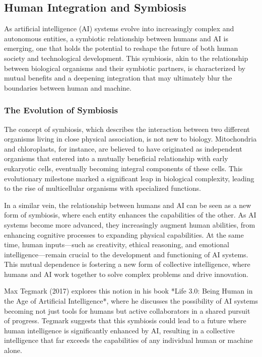 \documentclass[12pt,twoside]{article}
\begin{document}
\subsection{Human Integration and Symbiosis}
As artificial intelligence (AI) systems evolve into increasingly complex and autonomous entities, a symbiotic relationship between humans and AI is emerging, one that holds the potential to reshape the future of both human society and technological development. This symbiosis, akin to the relationship between biological organisms and their symbiotic partners, is characterized by mutual benefits and a deepening integration that may ultimately blur the boundaries between human and machine.

\subsubsection{The Evolution of Symbiosis}

The concept of symbiosis, which describes the interaction between two different organisms living in close physical association, is not new to biology. Mitochondria and chloroplasts, for instance, are believed to have originated as independent organisms that entered into a mutually beneficial relationship with early eukaryotic cells, eventually becoming integral components of these cells. This evolutionary milestone marked a significant leap in biological complexity, leading to the rise of multicellular organisms with specialized functions.

In a similar vein, the relationship between humans and AI can be seen as a new form of symbiosis, where each entity enhances the capabilities of the other. As AI systems become more advanced, they increasingly augment human abilities, from enhancing cognitive processes to expanding physical capabilities. At the same time, human inputs—such as creativity, ethical reasoning, and emotional intelligence—remain crucial to the development and functioning of AI systems. This mutual dependence is fostering a new form of collective intelligence, where humans and AI work together to solve complex problems and drive innovation.

Max Tegmark (2017) explores this notion in his book *Life 3.0: Being Human in the Age of Artificial Intelligence*, where he discusses the possibility of AI systems becoming not just tools for humans but active collaborators in a shared pursuit of progress. Tegmark suggests that this symbiosis could lead to a future where human intelligence is significantly enhanced by AI, resulting in a collective intelligence that far exceeds the capabilities of any individual human or machine alone.
\end{document}

